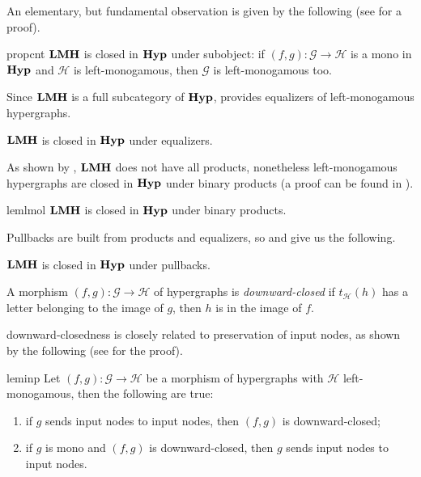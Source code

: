 \documentclass[3p]{elsarticle}
\newcommand{\catname}[1]{\textbf{\textup{#1}}}
\newcommand{\lmo}{\catname{LMH}}
\newcommand{\hyp}{\catname{Hyp}}
\theoremstyle{remark}
\theoremstyle{definition}
\begin{document}
An elementary, but fundamental observation is given by the following (see  for a proof).


\begin{restatable}{prop}{cnt}\label{prop:count}
	$\lmo$ is closed in $\hyp$ under subobject: if $(f,g)\colon \mathcal{G}\to \mathcal{H}$ is a mono in $\hyp$ and $\mathcal{H}$ is left-monogamous, then $\mathcal{G}$ is left-monogamous too.
\end{restatable}

Since $\lmo$ is a full subcategory of $\hyp$, 
 provides equalizers of left-monogamous hypergraphs.
\begin{cor}\label{cor:eq}
	$\lmo$ is closed in $\hyp$ under equalizers.
\end{cor}

As shown by , $\lmo$ does not have all products, nonetheless left-monogamous hypergraphs are closed in $\hyp$ under binary products (a proof can be found in ).

\begin{restatable}{lem}{lmol}\label{lem:pro}
	$\lmo$ is closed in $\hyp$ under binary products.
\end{restatable}

Pullbacks are built from products and equalizers, so   and  give us the following.

\begin{cor}	$\lmo$ is closed in $\hyp$ under pullbacks.
\end{cor}


\begin{defi}
A morphism $(f,g)\colon \mathcal{G}\to \mathcal{H}$ of hypergraphs  is \emph{downward-closed} if  $t_{\mathcal{H}}(h)$ has a letter belonging to the image of $g$, then $h$ is in the image of $f$. 
\end{defi}

downward-closedness is closely related to preservation of input nodes, as shown by the following (see  for the proof).

\begin{restatable}{lem}{inp}\label{lem:inp}
	Let $(f,g)\colon \mathcal{G}\to \mathcal{H}$ be a morphism of hypergraphs with $\mathcal{H}$ left-monogamous, then the following are true:
	\begin{enumerate}
		\item if $g$ sends input nodes to input nodes, then $(f,g)$ is downward-closed; 
		\item if $g$ is mono and $(f,g)$ is downward-closed, then $g$ sends input nodes to input nodes.
	\end{enumerate}
\end{restatable}
\end{document}
